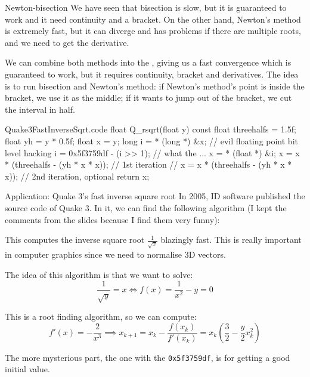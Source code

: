 \documentclass[a4paper]{article}
\begin{document}
\begin{parag}{Newton-bisection}
    We have seen that bisection is slow, but it is guaranteed to work and it need continuity and a bracket. On the other hand, Newton's method is extremely fast, but it can diverge and has problems if there are multiple roots, and we need to get the derivative.

    We can combine both methods into the , giving us a fast convergence which is guaranteed to work, but it requires continuity, bracket and derivatives. The idea is to run bisection and Newton's method: if Newton's method's point is inside the bracket, we use it as the middle; if it wants to jump out of the bracket, we cut the interval in half.
\end{parag}

\begin{filecontents*}[overwrite]{Quake3FastInverseSqrt.code}
float Q_rsqrt(float y) {
    const float threehalfs = 1.5f;
    float yh = y * 0.5f;
    float x = y;
    long i = * (long *) &x; // evil floating point bit level hacking
    i = 0x5f3759df - (i >> 1); // what the ...
    x = * (float *) &i;
    x = x * (threehalfs - (yh * x * x)); // 1st iteration
    // x = x * (threehalfs - (yh * x * x)); // 2nd iteration, optional
    return x;
}
\end{filecontents*}

\begin{parag}{Application: Quake 3's fast inverse square root}
    In 2005, ID software published the source code of Quake 3. In it, we can find the following algorithm (I kept the comments from the slides because I find them very funny):

    This computes the inverse square root $\frac{1}{\sqrt{x}}$ blazingly fast. This is really important in computer graphics since we need to normalise 3D vectors.

    The idea of this algorithm is that we want to solve: 
    \[\frac{1}{\sqrt{y}} = x \iff f\left(x\right) = \frac{1}{x^2} - y = 0\]
    
    This is a root finding algorithm, so we can compute: 
    \[f'\left(x\right) = -\frac{2}{x^3} \implies x_{k+1} = x_k - \frac{f\left(x_k\right)}{f'\left(x_k\right)} = x_k\left(\frac{3}{2} - \frac{y}{2} x_k^2\right)\]
    
    The more mysterious part, the one with the \texttt{0x5f3759df}, is for getting a good initial value.
\end{parag}
\end{document}
